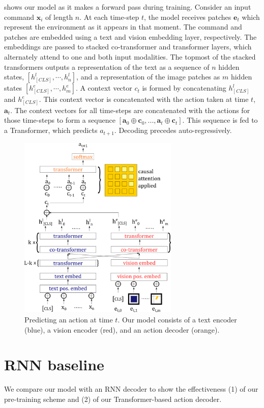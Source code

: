 \documentclass[11pt]{article}
\begin{document}
 shows our model as it makes a forward pass during training.
%
Consider an input command $\mathbf{x}_{i}$ of length $n$.
%
At each time-step $t$, the model receives patches $\mathbf{e}_t$ which represent the environment as it appears in that moment. 
%
The command and patches are embedded using a text and vision embedding layer, respectively. 
%
The embeddings are passed to stacked co-transformer and transformer layers, which alternately attend to one and both input modalities.
%
The topmost of the stacked transformers outputs a representation of the text as a sequence of $n$ hidden states, $[h_{[CLS]}^l,\cdots,h_{n}^l]$, and a representation of the image patches as $m$ hidden states $[h^e_{[CLS]}, \cdots, h^{e}_{m}]$.
%
A context vector $c_t$ is formed by concatenating $h_{[CLS]}^l$ and $h_{[CLS]}^e$.
%
This context vector is concatenated with the action taken at time $t$, $\mathbf{a}_t$.
%
The context vectors for all time-steps are concatenated with the actions for those time-steps to form a sequence $[\mathbf{a}_0\oplus \mathbf{c}_0, ..., \mathbf{a}_t \oplus \mathbf{c}_t]$.
%
This sequence is fed to a Transformer, which predicts $a_{t+1}$.
%
Decoding precedes auto-regressively.

\begin{figure}
\includegraphics[width=3in]{training_model.png}
\caption{Predicting an action at time $t$. Our model consists of a text encoder (blue), a vision encoder (red), and an action decoder (orange). }
\label{fig:training_model}	
\end{figure}

\section{RNN baseline}
We compare our model with an RNN decoder to show the effectiveness (1) of our pre-training scheme and (2) of our Transformer-based action decoder.
%
\end{document}
